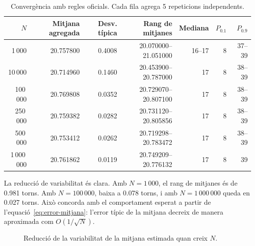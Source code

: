 \documentclass[conference,compsoc]{IEEEtran}
\begin{document}
\begin{table}[t]
\centering
\caption{Convergència amb regles oficials. Cada fila agrega 5 repeticions independents.}
\label{tab:convergencia}
\footnotesize
\begin{tabular}{rrrrrrr}
\toprule
$N$ & Mitjana agregada & Desv. típica & Rang de mitjanes & Mediana & $P_{0.1}$ & $P_{0.9}$ \\
\midrule
1\,000 & 20.757800 & 0.4008 & 20.070000--21.051000 & 16--17 & 8 & 37--39 \\
10\,000 & 20.714960 & 0.1460 & 20.453900--20.787000 & 17 & 8 & 38--39 \\
100\,000 & 20.769808 & 0.0352 & 20.729070--20.807100 & 17 & 8 & 38--39 \\
250\,000 & 20.759382 & 0.0282 & 20.731120--20.805856 & 17 & 8 & 38--39 \\
500\,000 & 20.753412 & 0.0262 & 20.719298--20.783472 & 17 & 8 & 38--39 \\
1\,000\,000 & 20.761862 & 0.0119 & 20.749209--20.776132 & 17 & 8 & 39 \\
\bottomrule
\end{tabular}
\end{table}

La reducció de variabilitat és clara. Amb $N=1\,000$, el rang de mitjanes és de
0.981 torns. Amb $N=100\,000$, baixa a 0.078 torns, i amb $N=1\,000\,000$ queda en
0.027 torns. Això concorda amb el comportament esperat a partir de
l'equació~\ref{eq:error-mitjana}: l'error típic de la mitjana decreix de manera
aproximada com $O(1/\sqrt{N})$.

\begin{figure}[H]
\centering
{}
\caption{Reducció de la variabilitat de la mitjana estimada quan creix $N$.}
\label{fig:convergencia-sd}
\end{figure}
\end{document}
